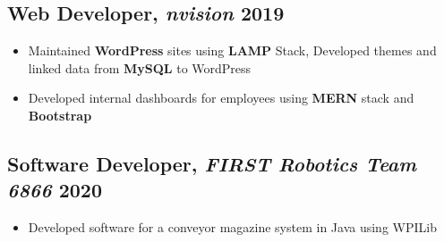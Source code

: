 \documentclass[9pt]{article}
\begin{document}
\subsection{Web Developer, \textit{nvision} \hfill \normalsize\textnormal{2019}}
\begin{itemize}
    \item Maintained \textbf{WordPress} sites using \textbf{LAMP} Stack, Developed themes and linked data from \textbf{MySQL} to WordPress
    \item Developed internal dashboards for employees using \textbf{MERN} stack and \textbf{Bootstrap} 
\end{itemize}


\subsection{Software Developer, \textit{FIRST Robotics Team 6866} \hfill \normalsize\textnormal{2020}}
\begin{itemize}
    \item Developed software for a conveyor magazine system in Java using WPILib
\end{itemize}


\end{document}
